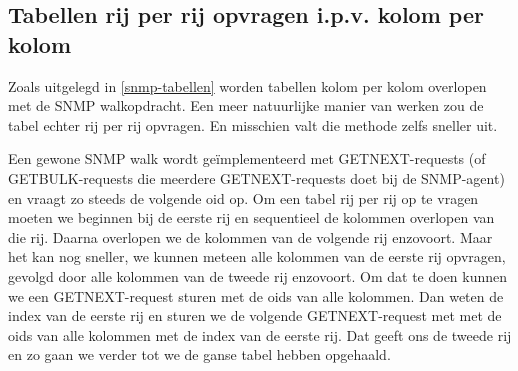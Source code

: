
\subsection{Tabellen rij per rij opvragen i.p.v. kolom per kolom}
\label{rij-per-rij}

Zoals uitgelegd in \cref{snmp-tabellen} worden tabellen kolom per kolom overlopen met de SNMP walkopdracht.
Een meer natuurlijke manier van werken zou de tabel echter rij per rij opvragen.
En misschien valt die methode zelfs sneller uit.

Een gewone SNMP walk wordt geïmplementeerd met GETNEXT-requests (of GETBULK-requests die meerdere GETNEXT-requests doet bij de SNMP-agent)
en vraagt zo steeds de volgende \gls{oid} op.
Om een tabel rij per rij op te vragen moeten we beginnen bij de eerste rij en sequentieel de kolommen overlopen van die rij.
Daarna overlopen we de kolommen van de volgende rij enzovoort.
Maar het kan nog sneller, we kunnen meteen alle kolommen van de eerste rij opvragen, gevolgd door alle kolommen van de tweede rij enzovoort.
Om dat te doen kunnen we een GETNEXT-request sturen met de \glspl{oid} van alle kolommen.
Dan weten de index van de eerste rij en sturen we de volgende GETNEXT-request met met de \glspl{oid} van alle kolommen met de index van de eerste rij.
Dat geeft ons de tweede rij en zo gaan we verder tot we de ganse tabel hebben opgehaald.

